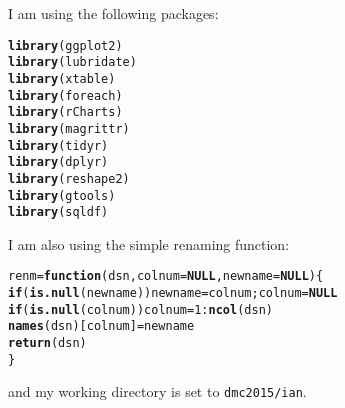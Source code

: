 \documentclass[10pt]{report}
\makeatletter
\newcommand{\hlnum}[1]{\textcolor[rgb]{0.686,0.059,0.569}{#1}}%
\newcommand{\hlopt}[1]{\textcolor[rgb]{0,0,0}{#1}}%
\newcommand{\hlstd}[1]{\textcolor[rgb]{0.345,0.345,0.345}{#1}}%
\newcommand{\hlkwa}[1]{\textcolor[rgb]{0.161,0.373,0.58}{\textbf{#1}}}%
\newcommand{\hlkwb}[1]{\textcolor[rgb]{0.69,0.353,0.396}{#1}}%
\newcommand{\hlkwc}[1]{\textcolor[rgb]{0.333,0.667,0.333}{#1}}%
\newcommand{\hlkwd}[1]{\textcolor[rgb]{0.737,0.353,0.396}{\textbf{#1}}}%
\newenvironment{kframe}{%
 \def\at@end@of@kframe{}%
 \ifinner\ifhmode%
  \def\at@end@of@kframe{\end{minipage}}%
  \begin{minipage}{\columnwidth}%
 \fi\fi%
 \def\FrameCommand##1{\hskip\@totalleftmargin \hskip-\fboxsep
 \colorbox{shadecolor}{##1}\hskip-\fboxsep
     \hskip-\linewidth \hskip-\@totalleftmargin \hskip\columnwidth}%
 \MakeFramed {\advance\hsize-\width
   \@totalleftmargin\z@ \linewidth\hsize
   \@setminipage}}%
 {\par\unskip\endMakeFramed%
 \at@end@of@kframe}
\newenvironment{knitrout}{}{} %
\makeatother
\begin{document}
%


\titleheader

I am using the following packages:
\begin{knitrout}
\color{fgcolor}\begin{kframe}
\begin{alltt}
   \hlkwd{library}\hlstd{(ggplot2)}
   \hlkwd{library}\hlstd{(lubridate)}
   \hlkwd{library}\hlstd{(xtable)}
   \hlkwd{library}\hlstd{(foreach)}
   \hlkwd{library}\hlstd{(rCharts)}
   \hlkwd{library}\hlstd{(magrittr)}
   \hlkwd{library}\hlstd{(tidyr)}
   \hlkwd{library}\hlstd{(dplyr)}
   \hlkwd{library}\hlstd{(reshape2)}
   \hlkwd{library}\hlstd{(gtools)}
   \hlkwd{library}\hlstd{(sqldf)}
\end{alltt}
\end{kframe}
\end{knitrout}
I am also using the simple renaming function:
\begin{knitrout}
\color{fgcolor}\begin{kframe}
\begin{alltt}
   \hlstd{renm} \hlkwb{=} \hlkwa{function}\hlstd{(}\hlkwc{dsn}\hlstd{,}\hlkwc{colnum}\hlstd{=}\hlkwa{NULL}\hlstd{,}\hlkwc{newname}\hlstd{=}\hlkwa{NULL}\hlstd{)\{}
      \hlkwa{if}\hlstd{(}\hlkwd{is.null}\hlstd{(newname)) newname}\hlkwb{=}\hlstd{colnum; colnum}\hlkwb{=}\hlkwa{NULL}
      \hlkwa{if} \hlstd{(}\hlkwd{is.null}\hlstd{(colnum)) colnum} \hlkwb{=} \hlnum{1}\hlopt{:}\hlkwd{ncol}\hlstd{(dsn)}
      \hlkwd{names}\hlstd{(dsn)[colnum]} \hlkwb{=} \hlstd{newname}
      \hlkwd{return}\hlstd{(dsn)}
   \hlstd{\}}
\end{alltt}
\end{kframe}
\end{knitrout}
and my working directory is set to \verb!dmc2015/ian!.
\end{document}
